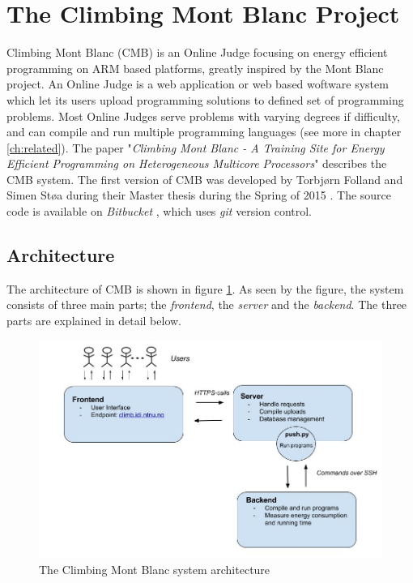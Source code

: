 \section{The Climbing Mont Blanc Project}
Climbing Mont Blanc (CMB) is an Online Judge focusing on energy efficient programming on ARM based platforms, greatly inspired by the Mont Blanc project. An Online Judge is a web application or web based woftware system which let its users upload programming solutions to defined set of programming problems. Most Online Judges serve problems with varying degrees if difficulty, and can compile and run multiple programming languages (see more in chapter \ref{ch:related}). The paper "\textit{Climbing Mont Blanc - A Training Site for Energy Efficient Programming on Heterogeneous Multicore Processors}" \cite{a:CMB} describes the CMB system. The first version of CMB was developed by Torbjørn Folland and Simen Støa during their Master thesis during the Spring of 2015 \cite{mt:T&S}. The source code is available on \textit{Bitbucket} \cite{m:bitbucket}, which uses \textit{git} \cite{m:git} version control.

\subsection{Architecture}
The architecture of CMB is shown in figure \ref{fig:cmb_arch}. As seen by the figure, the system consists of three main parts; the \textit{frontend}, the \textit{server} and the \textit{backend}. The three parts are explained in detail below.

\begin{figure}
  \includegraphics[width=1.0\textwidth]{figs/cmb_arch.jpg}
  \caption[The Climbing Mont Blanc system architecture]{The Climbing Mont Blanc system architecture}
  \label{fig:cmb_arch}
\end{figure}

